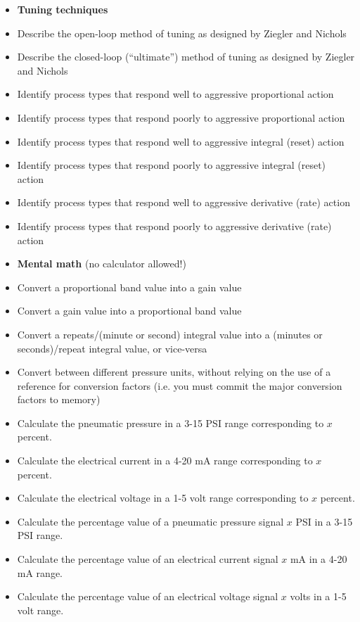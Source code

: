 \filbreak

\begin{itemize}
\item{} {\bf Tuning techniques}
\item{} Describe the open-loop method of tuning as designed by Ziegler and Nichols
\item{} Describe the closed-loop (``ultimate'') method of tuning as designed by Ziegler and Nichols
\item{} Identify process types that respond well to aggressive proportional action
\item{} Identify process types that respond poorly to aggressive proportional action
\item{} Identify process types that respond well to aggressive integral (reset) action
\item{} Identify process types that respond poorly to aggressive integral (reset) action
\item{} Identify process types that respond well to aggressive derivative (rate) action
\item{} Identify process types that respond poorly to aggressive derivative (rate) action
\end{itemize}

\filbreak

\begin{itemize}
\item{} {\bf Mental math} (no calculator allowed!)
\item{} Convert a proportional band value into a gain value
\item{} Convert a gain value into a proportional band value
\item{} Convert a repeats/(minute or second) integral value into a (minutes or seconds)/repeat integral value, or vice-versa
\item{} Convert between different pressure units, without relying on the use of a reference for conversion factors (i.e. you must commit the major conversion factors to memory)
\item{} Calculate the pneumatic pressure in a 3-15 PSI range corresponding to $x$ percent.
\item{} Calculate the electrical current in a 4-20 mA range corresponding to $x$ percent.
\item{} Calculate the electrical voltage in a 1-5 volt range corresponding to $x$ percent.
\item{} Calculate the percentage value of a pneumatic pressure signal $x$ PSI in a 3-15 PSI range.
\item{} Calculate the percentage value of an electrical current signal $x$ mA in a 4-20 mA range.
\item{} Calculate the percentage value of an electrical voltage signal $x$ volts in a 1-5 volt range.
\end{itemize}

